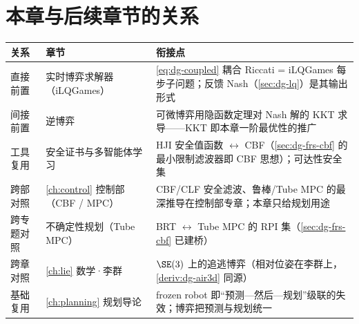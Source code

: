 \section*{本章与后续章节的关系}
\begin{table}[H]\centering\small
\begin{tabular}{lll}
\toprule
关系 & 章节 & 衔接点 \\
\midrule
直接前置 & 实时博弈求解器（iLQGames） & \cref{eq:dg-coupled} 耦合 Riccati = iLQGames 每步子问题；反馈 Nash（\cref{sec:dg-lq}）是其输出形式 \\
间接前置 & 逆博弈 & 可微博弈用隐函数定理对 Nash 解的 KKT 求导——KKT 即本章一阶最优性的推广 \\
工具复用 & 安全证书与多智能体学习 & HJI 安全值函数 $\leftrightarrow$ CBF（\cref{sec:dg-frs-cbf} 的最小限制滤波器即 CBF 思想）；可达性安全集 \\
跨部对照 & \cref{ch:control} 控制部（CBF / MPC） & CBF/CLF 安全滤波、鲁棒/Tube MPC 的最深推导在控制部专章；本章只给规划用途 \\
跨专题对照 & 不确定性规划（Tube MPC） & BRT $\leftrightarrow$ Tube MPC 的 RPI 集（\cref{sec:dg-frs-cbf} 已建桥） \\
跨章对照 & \cref{ch:lie} 数学·李群 & $\SE(3)$ 上的追逃博弈（相对位姿在李群上，\cref{deriv:dg-air3d} 同源） \\
基础复用 & \cref{ch:planning} 规划导论 & frozen robot 即“预测—然后—规划”级联的失效；博弈把预测与规划统一 \\
\bottomrule
\end{tabular}
\end{table}

